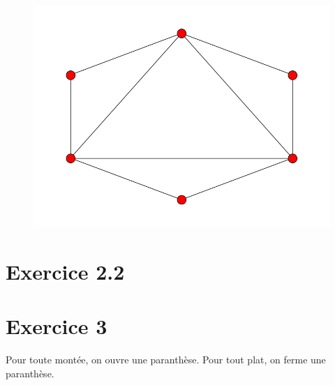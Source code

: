 \documentclass[fontsize=10pt]{article}
\begin{document}
\begin{figure}[hbtp]
\centering
\includegraphics[scale=0.5]{imgs/hexagon/hexagon_14.png}
\end{figure}

\clearpage

\section*{Exercice 2.2}

\section*{Exercice 3}
Pour toute montée, on ouvre une paranthèse. \newline
Pour tout plat, on ferme une paranthèse.
\end{document}
